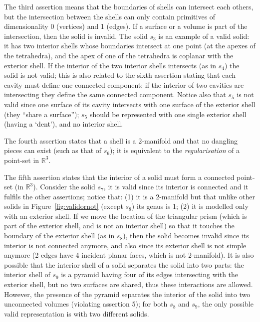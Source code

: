 The third assertion means that the boundaries of shells can intersect each others, but the intersection between the shells can only contain primitives of dimensionality 0 (vertices) and 1 (edges).
If a surface or a volume is part of the intersection, then the solid is invalid.
The solid $s_3$ is an example of a valid solid: it has two interior shells whose boundaries intersect at one point (at the apexes of the tetrahedra), and the apex of one of the tetrahedra is coplanar with the exterior shell.
If the interior of the two interior shells intersects (as in $s_4$) the solid is not valid; this is also related to the sixth assertion stating that each cavity must define one connected component: if the interior of two cavities are intersecting they define the same connected component.
Notice also that $s_5$ is not valid since one surface of its cavity intersects with one surface of the exterior shell (they ``share a surface''); $s_5$ should be represented with one single exterior shell (having a `dent'), and no interior shell.

The fourth assertion states that a shell is a 2-manifold and that no dangling pieces can exist (such as that of $s_6$); it is equivalent to the \emph{regularisation} of a point-set in $\mathbb{R}^3$.

The fifth assertion states that the interior of a solid must form a connected point-set (in $\mathbb{R}^3$).
Consider the solid $s_7$, it is valid since its interior is connected and it fulfils the other assertions; notice that: (1) it is a 2-manifold but that unlike other solids in Figure~\ref{fig:validornot} (except $s_8$) its genus is 1; (2) it is modelled only with an exterior shell.
If we move the location of the triangular prism (which is part of the exterior shell, and is not an interior shell) so that it touches the boundary of the exterior shell (as in $s_8$), then the solid becomes invalid since its interior is not connected anymore, and also since its exterior shell is not simple anymore (2 edges have 4 incident planar faces, which is not 2-manifold).
It is also possible that the interior shell of a solid separates the solid into two parts: the interior shell of $s_9$ is a pyramid having four of its edges intersecting with the exterior shell, but no two surfaces are shared, thus these interactions are allowed.
However, the presence of the pyramid separates the interior of the solid into two unconnected volumes (violating assertion 5); for both $s_8$ and $s_9$, the only possible valid representation is with two different solids.

